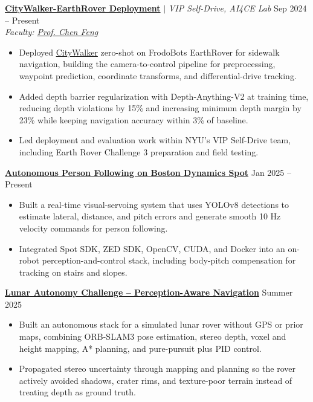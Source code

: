\documentclass[10pt,letterpaper]{article}
\begin{document}
\href{https://github.com/vivekmattam02/citywalker-earthrover}{\textbf{CityWalker-EarthRover Deployment}} $|$ \textit{VIP Self-Drive, AI4CE Lab} \hfill Sep 2024 -- Present \\
\textit{Faculty: \href{https://scholar.google.com/citations?user=YeG8ZM0AAAAJ}{Prof. Chen Feng}}
\begin{itemize}
    \item Deployed \href{https://ai4ce.github.io/CityWalker/}{CityWalker} zero-shot on FrodoBots EarthRover for sidewalk navigation, building the camera-to-control pipeline for preprocessing, waypoint prediction, coordinate transforms, and differential-drive tracking.
    \item Added depth barrier regularization with Depth-Anything-V2 at training time, reducing depth violations by 15\% and increasing minimum depth margin by 23\% while keeping navigation accuracy within 3\% of baseline.
    \item Led deployment and evaluation work within NYU's VIP Self-Drive team, including Earth Rover Challenge 3 preparation and field testing.
\end{itemize}
\vspace{1pt}

\href{https://github.com/vivekmattam02/spot}{\textbf{Autonomous Person Following on Boston Dynamics Spot}} \hfill Jan 2025 -- Present
\begin{itemize}
    \item Built a real-time visual-servoing system that uses YOLOv8 detections to estimate lateral, distance, and pitch errors and generate smooth 10 Hz velocity commands for person following.
    \item Integrated Spot SDK, ZED SDK, OpenCV, CUDA, and Docker into an on-robot perception-and-control stack, including body-pitch compensation for tracking on stairs and slopes.
\end{itemize}
\vspace{1pt}

\href{https://github.com/vivekmattam02/LAC_26}{\textbf{Lunar Autonomy Challenge -- Perception-Aware Navigation}} \hfill Summer 2025
\begin{itemize}
    \item Built an autonomous stack for a simulated lunar rover without GPS or prior maps, combining ORB-SLAM3 pose estimation, stereo depth, voxel and height mapping, A* planning, and pure-pursuit plus PID control.
    \item Propagated stereo uncertainty through mapping and planning so the rover actively avoided shadows, crater rims, and texture-poor terrain instead of treating depth as ground truth.
\end{itemize}
\vspace{1pt}
\end{document}
